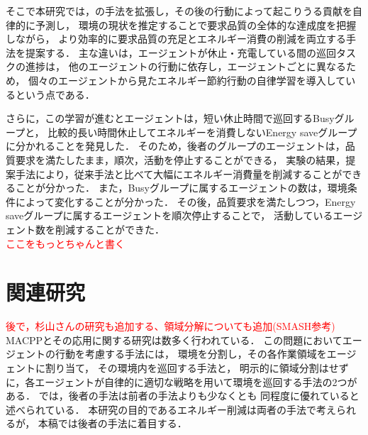 \documentclass[12pt,a4j,twoside]{jarticle}
\def\red#1{\textcolor{red}{#1}}
\begin{document}
そこで本研究では，\cite{Wu2019}の手法を拡張し，その後の行動によって起こりうる貢献を自律的に予測し，
環境の現状を推定することで要求品質の全体的な達成度を把握しながら，
より効率的に要求品質の充足とエネルギー消費の削減を両立する手法を提案する．
主な違いは，エージェントが休止・充電している間の巡回タスクの進捗は，
他のエージェントの行動に依存し，エージェントごとに異なるため，
個々のエージェントから見たエネルギー節約行動の自律学習を導入しているという点である．
\par

さらに，この学習が進むとエージェントは，短い休止時間で巡回するBusyグループと，
比較的長い時間休止してエネルギーを消費しないEnergy saveグループに分かれることを発見した．
そのため，後者のグループのエージェントは，品質要求を満たしたまま，順次，活動を停止することができる，
実験の結果，提案手法により，従来手法と比べて大幅にエネルギー消費量を削減することができることが分かった．
また，Busyグループに属するエージェントの数は，環境条件によって変化することが分かった．
その後，品質要求を満たしつつ，Energy saveグループに属するエージェントを順次停止することで，
活動しているエージェント数を削減することができた．
\\ \red{ここをもっとちゃんと書く}
\par

\section{関連研究}
\red{後で，杉山さんの研究も追加する、領域分解についても追加(SMASH参考)}\\
MACPPとその応用に関する研究は数多く行われている．
この問題においてエージェントの行動を考慮する手法には，
環境を分割し，その各作業領域をエージェントに割り当て，
その環境内を巡回する手法\cite{Hattori2021,Mazda2005,Agmon2011,Tevyashov2022,Wiandt2018}と，
明示的に領域分割はせずに，各エージェントが自律的に適切な戦略を用いて環境を巡回する手法の2つがある．
\cite{Chevaleyre2004}では，後者の手法は前者の手法よりも少なくとも
同程度に優れていると述べられている．
本研究の目的であるエネルギー削減は両者の手法で考えられるが，
本稿では後者の手法に着目する．
\par
\end{document}
